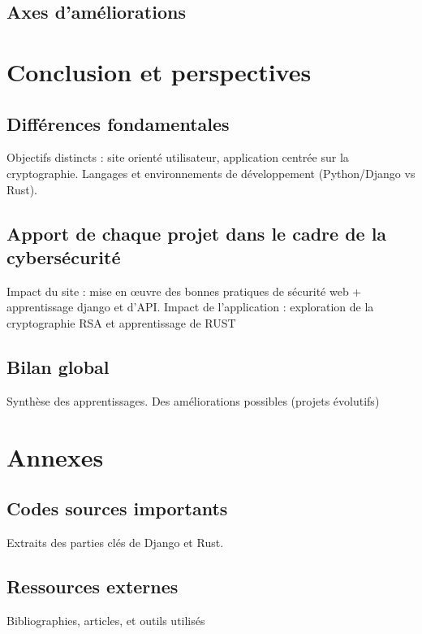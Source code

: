 \documentclass[12pt]{article} %
\begin{document}
	\subsection{Axes d'améliorations}






























\newpage

\section{Conclusion et perspectives}
	\subsection{Différences fondamentales}
		Objectifs distincts : site orienté utilisateur, application centrée sur la cryptographie.
Langages et environnements de développement (Python/Django vs Rust).


	\subsection{Apport de chaque projet dans le cadre de la cybersécurité}
		Impact du site : mise en œuvre des bonnes pratiques de sécurité web + apprentissage django et d’API.
Impact de l’application : exploration de la cryptographie RSA et apprentissage de RUST
	
	
	
	\subsection{Bilan global}
		Synthèse des apprentissages.
Des améliorations possibles (projets évolutifs)


\newpage
\section*{Annexes}
	\subsection{Codes sources importants}
		Extraits des parties clés de Django et Rust.
	\subsection{Ressources externes}
		Bibliographies, articles, et outils utilisés
\end{document}
